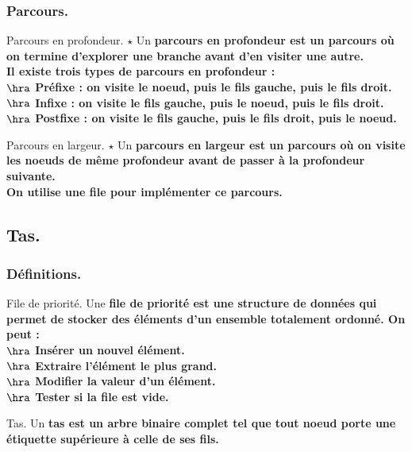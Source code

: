 \documentclass[french, 11pt]{article}
\begin{document}
\subsubsection{Parcours.}

\begin{defi}{Parcours en profondeur. $\star$}{}
    Un \bf{parcours en profondeur} est un parcours où on termine d'explorer une branche avant d'en visiter une autre.\\
    Il existe trois types de parcours en profondeur :\\
    $\hra$ \bf{Préfixe} : on visite le noeud, puis le fils gauche, puis le fils droit.\\
    $\hra$ \bf{Infixe} : on visite le fils gauche, puis le noeud, puis le fils droit.\\
    $\hra$ \bf{Postfixe} : on visite le fils gauche, puis le fils droit, puis le noeud.
\end{defi}

\begin{defi}{Parcours en largeur. $\star$}{}
    Un \bf{parcours en largeur} est un parcours où on visite les noeuds de même profondeur avant de passer à la profondeur suivante.\\
    On utilise une file pour implémenter ce parcours.
\end{defi}

\subsection{Tas.}

\subsubsection{Définitions.}

\begin{defi}{File de priorité.}{}
    Une \bf{file de priorité} est une structure de données qui permet de stocker des éléments d'un ensemble totalement ordonné. On peut :\\
    $\hra$ Insérer un nouvel élément.\\
    $\hra$ Extraire l'élément le plus grand.\\
    $\hra$ Modifier la valeur d'un élément.\\
    $\hra$ Tester si la file est vide.
\end{defi}

\begin{defi}{Tas.}{}
    Un \bf{tas} est un arbre binaire complet tel que tout noeud porte une étiquette supérieure à celle de ses fils.
\end{defi}
\end{document}
